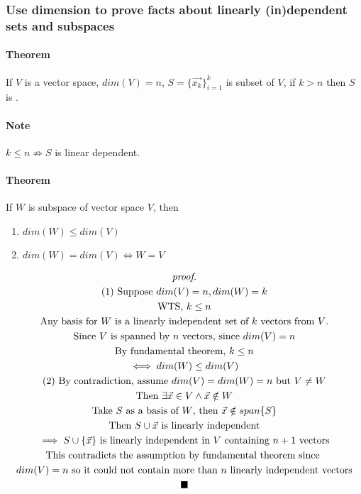 \documentclass[11pt]{article}
\begin{document}
	\subsubsection{Use dimension to prove facts about linearly (in)dependent sets and subspaces}
	\paragraph{Theorem} If $V$ is a vector space, $dim(V)=n$, $S = \{\vec{x_k}\}_{i=1}^k$ is subset of $V$, if $k > n$ then $S$ is .
	\paragraph{Note} $k \leq n \nRightarrow S$ is linear dependent.
	
	\paragraph{Theorem} If $W$ is subspace of vector space $V$, then
		\begin{enumerate}
			\item $dim(W) \leq dim(V)$
			\item $dim(W) = dim(V) \iff W = V$
		\end{enumerate}
	\begin{multline*}
		\emph{proof.} \\
			\text{(1) Suppose } dim(V) = n, dim(W) = k \\
			\text{WTS, } k \leq n \\
			\text{Any basis for $W$ is a linearly independent set of $k$ vectors from $V$.}\\
			\text{Since $V$ is spanned by $n$ vectors, since $dim(V) = n$} \\ 
			\text{By fundamental theorem, } k \leq n \\
			\iff dim(W) \leq dim(V)\\
			\text{(2) By contradiction, assume } dim(V) = dim(W) = n \text{ but } V \neq W \\
			\text{Then }\exists \vec{x} \in V \land \vec{x} \notin W \\
			\text{Take $S$ as a basis of $W$, then }\vec{x} \notin span\{S\} \\
			\text{Then } S \cup \vec{x} \text{ is linearly independent} \\
			\implies S \cup \{\vec{x}\} \text{ is linearly independent in $V$ containing $n + 1$ vectors} \\
			\text{This contradicts the assumption by fundamental theorem since }\\
			dim(V) = n \text{ so it could not contain more than $n$ linearly independent vectors}\\
			\blacksquare
	\end{multline*}
	
\end{document}
